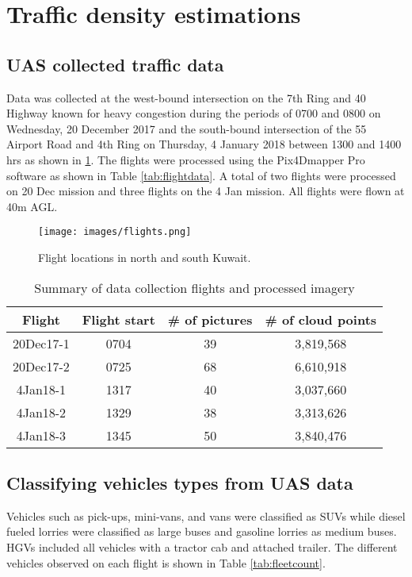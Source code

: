 \section{Traffic density estimations}


\subsection{UAS collected traffic data}
Data was collected at the west-bound intersection on the 7th Ring and 40 Highway known for heavy congestion during the periods of 0700 and 0800 on Wednesday, 20 December 2017 and the south-bound intersection of the 55 Airport Road and 4th Ring on Thursday, 4 January 2018 between 1300 and 1400 hrs as shown in \ref{fig:flights}. The flights were processed using the Pix4Dmapper Pro software as shown in Table \ref{tab:flightdata}. A total of two flights were processed on 20 Dec mission and three flights on the 4 Jan mission. All flights were flown at 40m AGL.

\begin{figure}[!htb]
\texttt{[image: images/flights.png]} 
\caption[Flight locations]{Flight locations in north and south Kuwait.}
\label{fig:flights}
\end{figure}


\begin{table}[!htb]
\centering
\caption{Summary of data collection flights and processed imagery}
\label{tb:flightdata}
\begin{tabular}{@{}cccc@{}}
\toprule
\textbf{Flight} & \textbf{Flight start} & \textbf{\# of pictures} & \textbf{\# of cloud points} \\ \midrule
20Dec17-1 & 0704 & 39 & 3,819,568 \\
20Dec17-2 & 0725 & 68 & 6,610,918 \\
4Jan18-1 & 1317 & 40 & 3,037,660 \\
4Jan18-2 & 1329 & 38 & 3,313,626 \\
4Jan18-3 & 1345 & 50 & 3,840,476 \\ \bottomrule
\end{tabular}
\end{table}


\subsection{Classifying vehicles types from UAS data}
Vehicles such as pick-ups, mini-vans, and vans were classified as SUVs while diesel fueled lorries were classified as large buses and gasoline lorries as medium buses. HGVs included all vehicles with a tractor cab and attached trailer. The different vehicles observed on each flight is shown in Table \ref{tab:fleetcount}.

